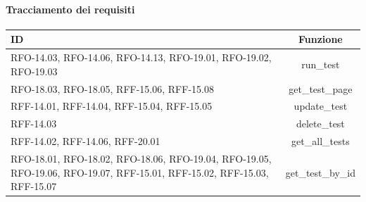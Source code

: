 \paragraph{Tracciamento dei requisiti}
\begin{tabularx}{\textwidth}{|X|c|}
    \hline
    \textbf{ID} & \textbf{Funzione} \\
    \hline
        RFO-14.03, RFO-14.06, RFO-14.13, RFO-19.01, RFO-19.02, RFO-19.03  & run\_test \\
    \hline
        RFO-18.03, RFO-18.05, RFF-15.06, RFF-15.08 & get\_test\_page \\
    \hline
        RFF-14.01, RFF-14.04, RFF-15.04, RFF-15.05  & update\_test \\
    \hline
        RFF-14.03 & delete\_test \\
    \hline
        RFF-14.02, RFF-14.06, RFF-20.01 & get\_all\_tests \\
    \hline
        RFO-18.01, RFO-18.02, RFO-18.06, RFO-19.04, RFO-19.05, RFO-19.06, RFO-19.07, RFF-15.01, RFF-15.02, RFF-15.03, RFF-15.07 & get\_test\_by\_id \\
    \hline
\end{tabularx}
